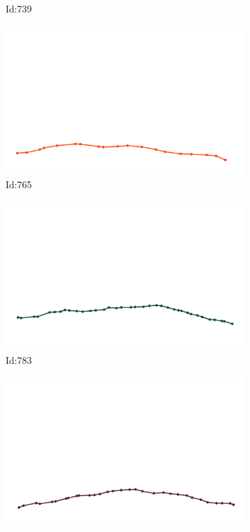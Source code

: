 \documentclass[12pt,twoside]{report}
\begin{document}
\begin{figure}
\begin{subfigure}[b]{0.20\textwidth}
\caption{Id:739}
\end{subfigure}
\begin{subfigure}[b]{0.20\textwidth}
\centering
\includegraphics[width=\textwidth]{../trajectories/765.png}
\caption{Id:765}
\end{subfigure}
\begin{subfigure}[b]{0.20\textwidth}
\centering
\includegraphics[width=\textwidth]{../trajectories/783.png}
\caption{Id:783}
\end{subfigure}
\begin{subfigure}[b]{0.20\textwidth}
\centering
\includegraphics[width=\textwidth]{../trajectories/788.png}

\end{subfigure}
\end{figure}
\end{document}
